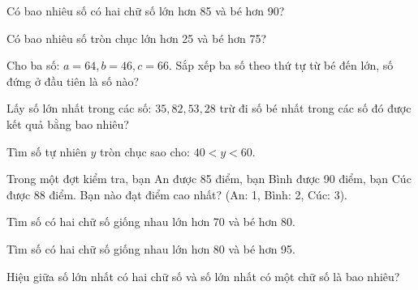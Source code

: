 \begin{ex}
Có bao nhiêu số có hai chữ số lớn hơn 85 và bé hơn 90?
\end{ex}

\begin{ex}
Có bao nhiêu số tròn chục lớn hơn 25 và bé hơn 75?
\end{ex}

\begin{ex}
Cho ba số: $a = 64, b = 46, c = 66$. Sắp xếp ba số theo thứ tự từ bé đến lớn, số đứng ở đầu tiên là số nào?
\end{ex}

\begin{ex}
Lấy số lớn nhất trong các số: $35, 82, 53, 28$ trừ đi số bé nhất trong các số đó được kết quả bằng bao nhiêu?
\end{ex}

\begin{ex}
Tìm số tự nhiên $y$ tròn chục sao cho: $40 < y < 60$.
\end{ex}

\begin{ex}
Trong một đợt kiểm tra, bạn An được 85 điểm, bạn Bình được 90 điểm, bạn Cúc được 88 điểm. Bạn nào đạt điểm cao nhất? (An: 1, Bình: 2, Cúc: 3).
\end{ex}

\begin{ex}
Tìm số có hai chữ số giống nhau lớn hơn 70 và bé hơn 80.
\end{ex}

\begin{ex}
Tìm số có hai chữ số giống nhau lớn hơn 80 và bé hơn 95.
\end{ex}

\begin{ex}
Hiệu giữa số lớn nhất có hai chữ số và số lớn nhất có một chữ số là bao nhiêu?
\end{ex}

